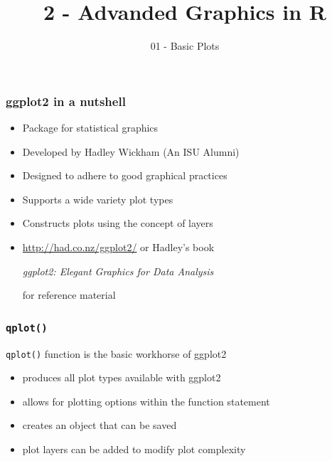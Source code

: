 \documentclass{beamer}\usepackage[]{graphicx}\usepackage[]{color}
\title[Advanced Graphics in R ]{2 - Advanded Graphics in R}
\subtitle{01 - Basic Plots}
\date{}
\institute[ISU]{Iowa State University}
\begin{document}
\begin{frame}
    \maketitle
\end{frame}


\begin{frame}
\frametitle{ggplot2 in a nutshell}
    \begin{itemize}
        \item Package for statistical graphics
        \item Developed by Hadley Wickham (An ISU Alumni)
        \item Designed to adhere to good graphical practices
        \item Supports a wide variety plot types
        \item Constructs plots using the concept of layers\medskip
        \item \url{http://had.co.nz/ggplot2/} or Hadley's book \begin{center}\emph{ggplot2: Elegant Graphics for Data Analysis}\end{center} for reference material
    \end{itemize}    
\end{frame}


\begin{frame}
\frametitle{\texttt{qplot()}}
  \texttt{qplot()} function is the basic workhorse of ggplot2\bigskip
    \begin{itemize}
        \item produces all plot types available with ggplot2\medskip
        \item allows for plotting options within the function statement\medskip
        \item creates an object that can be saved\medskip
        \item plot layers can be added to modify plot complexity
    \end{itemize}    
\end{frame}

\end{document}
